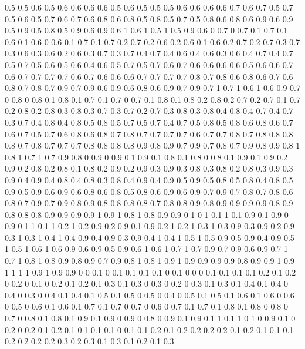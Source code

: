 0.5 0.5
0.6 0.5
0.6 0.6
0.6 0.6
0.5 0.6
0.5 0.5
0.5 0.6
0.6 0.6
0.6 0.7
0.6 0.7
0.5 0.7
0.5 0.6
0.5 0.7
0.6 0.7
0.6 0.8
0.6 0.8
0.5 0.8
0.5 0.7
0.5 0.8
0.6 0.8
0.6 0.9
0.6 0.9
0.5 0.9
0.5 0.8
0.5 0.9
0.6 0.9
0.6 1
0.6 1
0.5 1
0.5 0.9
0.6 0
0.7 0
0.7 0.1
0.7 0.1
0.6 0.1
0.6 0
0.6 0.1
0.7 0.1
0.7 0.2
0.7 0.2
0.6 0.2
0.6 0.1
0.6 0.2
0.7 0.2
0.7 0.3
0.7 0.3
0.6 0.3
0.6 0.2
0.6 0.3
0.7 0.3
0.7 0.4
0.7 0.4
0.6 0.4
0.6 0.3
0.6 0.4
0.7 0.4
0.7 0.5
0.7 0.5
0.6 0.5
0.6 0.4
0.6 0.5
0.7 0.5
0.7 0.6
0.7 0.6
0.6 0.6
0.6 0.5
0.6 0.6
0.7 0.6
0.7 0.7
0.7 0.7
0.6 0.7
0.6 0.6
0.6 0.7
0.7 0.7
0.7 0.8
0.7 0.8
0.6 0.8
0.6 0.7
0.6 0.8
0.7 0.8
0.7 0.9
0.7 0.9
0.6 0.9
0.6 0.8
0.6 0.9
0.7 0.9
0.7 1
0.7 1
0.6 1
0.6 0.9
0.7 0
0.8 0
0.8 0.1
0.8 0.1
0.7 0.1
0.7 0
0.7 0.1
0.8 0.1
0.8 0.2
0.8 0.2
0.7 0.2
0.7 0.1
0.7 0.2
0.8 0.2
0.8 0.3
0.8 0.3
0.7 0.3
0.7 0.2
0.7 0.3
0.8 0.3
0.8 0.4
0.8 0.4
0.7 0.4
0.7 0.3
0.7 0.4
0.8 0.4
0.8 0.5
0.8 0.5
0.7 0.5
0.7 0.4
0.7 0.5
0.8 0.5
0.8 0.6
0.8 0.6
0.7 0.6
0.7 0.5
0.7 0.6
0.8 0.6
0.8 0.7
0.8 0.7
0.7 0.7
0.7 0.6
0.7 0.7
0.8 0.7
0.8 0.8
0.8 0.8
0.7 0.8
0.7 0.7
0.7 0.8
0.8 0.8
0.8 0.9
0.8 0.9
0.7 0.9
0.7 0.8
0.7 0.9
0.8 0.9
0.8 1
0.8 1
0.7 1
0.7 0.9
0.8 0
0.9 0
0.9 0.1
0.9 0.1
0.8 0.1
0.8 0
0.8 0.1
0.9 0.1
0.9 0.2
0.9 0.2
0.8 0.2
0.8 0.1
0.8 0.2
0.9 0.2
0.9 0.3
0.9 0.3
0.8 0.3
0.8 0.2
0.8 0.3
0.9 0.3
0.9 0.4
0.9 0.4
0.8 0.4
0.8 0.3
0.8 0.4
0.9 0.4
0.9 0.5
0.9 0.5
0.8 0.5
0.8 0.4
0.8 0.5
0.9 0.5
0.9 0.6
0.9 0.6
0.8 0.6
0.8 0.5
0.8 0.6
0.9 0.6
0.9 0.7
0.9 0.7
0.8 0.7
0.8 0.6
0.8 0.7
0.9 0.7
0.9 0.8
0.9 0.8
0.8 0.8
0.8 0.7
0.8 0.8
0.9 0.8
0.9 0.9
0.9 0.9
0.8 0.9
0.8 0.8
0.8 0.9
0.9 0.9
0.9 1
0.9 1
0.8 1
0.8 0.9
0.9 0
1 0
1 0.1
1 0.1
0.9 0.1
0.9 0
0.9 0.1
1 0.1
1 0.2
1 0.2
0.9 0.2
0.9 0.1
0.9 0.2
1 0.2
1 0.3
1 0.3
0.9 0.3
0.9 0.2
0.9 0.3
1 0.3
1 0.4
1 0.4
0.9 0.4
0.9 0.3
0.9 0.4
1 0.4
1 0.5
1 0.5
0.9 0.5
0.9 0.4
0.9 0.5
1 0.5
1 0.6
1 0.6
0.9 0.6
0.9 0.5
0.9 0.6
1 0.6
1 0.7
1 0.7
0.9 0.7
0.9 0.6
0.9 0.7
1 0.7
1 0.8
1 0.8
0.9 0.8
0.9 0.7
0.9 0.8
1 0.8
1 0.9
1 0.9
0.9 0.9
0.9 0.8
0.9 0.9
1 0.9
1 1
1 1
0.9 1
0.9 0.9
0 0
0.1 0
0.1 0.1
0.1 0.1
0 0.1
0 0
0 0.1
0.1 0.1
0.1 0.2
0.1 0.2
0 0.2
0 0.1
0 0.2
0.1 0.2
0.1 0.3
0.1 0.3
0 0.3
0 0.2
0 0.3
0.1 0.3
0.1 0.4
0.1 0.4
0 0.4
0 0.3
0 0.4
0.1 0.4
0.1 0.5
0.1 0.5
0 0.5
0 0.4
0 0.5
0.1 0.5
0.1 0.6
0.1 0.6
0 0.6
0 0.5
0 0.6
0.1 0.6
0.1 0.7
0.1 0.7
0 0.7
0 0.6
0 0.7
0.1 0.7
0.1 0.8
0.1 0.8
0 0.8
0 0.7
0 0.8
0.1 0.8
0.1 0.9
0.1 0.9
0 0.9
0 0.8
0 0.9
0.1 0.9
0.1 1
0.1 1
0 1
0 0.9
0.1 0
0.2 0
0.2 0.1
0.2 0.1
0.1 0.1
0.1 0
0.1 0.1
0.2 0.1
0.2 0.2
0.2 0.2
0.1 0.2
0.1 0.1
0.1 0.2
0.2 0.2
0.2 0.3
0.2 0.3
0.1 0.3
0.1 0.2
0.1 0.3
